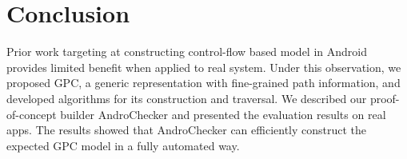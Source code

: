  


  

\section{Conclusion}
Prior work targeting at constructing control-flow based model in Android provides limited benefit when applied to real system. Under this observation, we proposed GPC, a generic representation with fine-grained path information, and developed algorithms for its construction and traversal. We described our proof-of-concept builder AndroChecker and presented the evaluation results on real apps. The results showed that AndroChecker can efficiently construct the expected GPC model in a fully automated way. 



